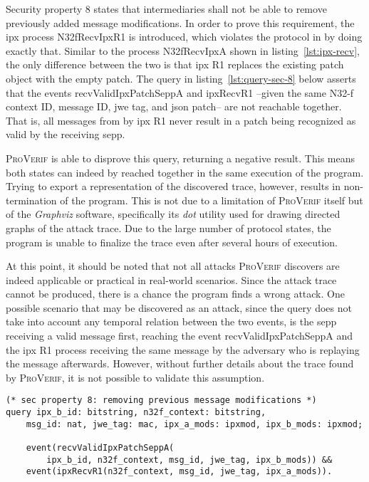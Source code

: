 Security property 8 states that intermediaries shall not be able to remove previously added message modifications.
In order to prove this requirement, the \gls{ipx} process {\sffamily N32fRecvIpxR1} is introduced, which violates the protocol in by doing exactly that.
Similar to the process {\sffamily N32fRecvIpxA} shown in listing~\ref{lst:ipx-recv}, the only difference between the two is that \gls{ipx} R1 replaces the existing patch object with the empty patch.
The query in listing~\ref{lst:query-sec-8} below asserts that the events {\sffamily recvValidIpxPatchSeppA} and {\sffamily ipxRecvR1} --given the same N32-f context ID, message ID, \gls{jwe} tag, and \gls{json} patch-- are not reachable together.
That is, all messages from by \gls{ipx} R1 never result in a patch being recognized as valid by the receiving \gls{sepp}.

\textsc{ProVerif} is able to disprove this query, returning a negative result.
This means both states can indeed by reached together in the same execution of the program.
Trying to export a representation of the discovered trace, however, results in non-termination of the program.
This is not due to a limitation of \textsc{ProVerif} itself but of the \textit{Graphviz} software, specifically its \textit{dot} utility used for drawing directed graphs of the attack trace.
Due to the large number of protocol states, the program is unable to finalize the trace even after several hours of execution.

At this point, it should be noted that not all attacks \textsc{ProVerif} discovers are indeed applicable or practical in real-world scenarios.
Since the attack trace cannot be produced, there is a chance the program finds a wrong attack.
One possible scenario that may be discovered as an attack, since the query does not take into account any temporal relation between the two events, is the \gls{sepp} receiving a valid message first, reaching the event {\sffamily recvValidIpxPatchSeppA} and the \gls{ipx} R1 process receiving the same message by the adversary who is replaying the message afterwards.
However, without further details about the trace found by \textsc{ProVerif}, it is not possible to validate this assumption.

\begin{lstlisting}[caption={Query for security property 8},label={lst:query-sec-8},firstnumber=359]
(* sec property 8: removing previous message modifications *)
query ipx_b_id: bitstring, n32f_context: bitstring,
    msg_id: nat, jwe_tag: mac, ipx_a_mods: ipxmod, ipx_b_mods: ipxmod;

    event(recvValidIpxPatchSeppA(
        ipx_b_id, n32f_context, msg_id, jwe_tag, ipx_b_mods)) &&
    event(ipxRecvR1(n32f_context, msg_id, jwe_tag, ipx_a_mods)).
\end{lstlisting}

